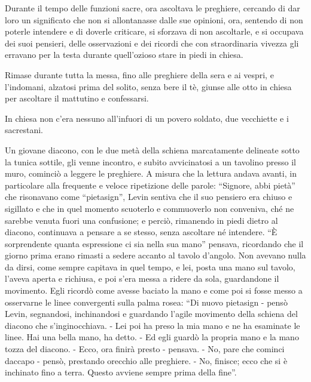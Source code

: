 Durante il tempo delle funzioni sacre, ora ascoltava le preghiere, cercando di dar loro un significato che non si allontanasse dalle sue opinioni, ora, sentendo di non poterle intendere e di doverle criticare, si sforzava di non ascoltarle, e si occupava dei suoi pensieri, delle osservazioni e dei ricordi che con straordinaria vivezza gli erravano per la testa durante quell'ozioso stare in piedi in chiesa. 

Rimase durante tutta la messa, fino alle preghiere della sera e ai vespri, e l'indomani, alzatosi prima del solito, senza bere il tè, giunse alle otto in chiesa per ascoltare il mattutino e confessarsi. 

In chiesa non c'era nessuno all'infuori di un povero soldato, due vecchiette e i sacrestani. 
\enlargethispage*{1\baselineskip}

Un giovane diacono, con le due metà della schiena marcatamente delineate sotto la tunica sottile, gli venne incontro, e subito avvicinatosi a un tavolino presso il muro, cominciò a leggere le preghiere. A misura che la lettura andava avanti, in particolare alla frequente e veloce ripetizione delle parole: ``Signore, abbi pietà'' che risonavano come ``pietasign'', Levin sentiva che il suo pensiero era chiuso e sigillato e che in quel momento scuoterlo e commuoverlo non conveniva, ché ne sarebbe venuta fuori una confusione; e perciò, rimanendo in piedi dietro al diacono, continuava a pensare a se stesso, senza ascoltare né intendere. ``È sorprendente quanta espressione ci sia nella sua mano'' pensava, ricordando che il giorno prima erano rimasti a sedere accanto al tavolo d'angolo. Non avevano nulla da dirsi, come sempre capitava in quel tempo, e lei, posta una mano sul tavolo, l'aveva aperta e richiusa, e poi s'era messa a ridere da sola, guardandone il movimento. Egli ricordò come avesse baciato la mano e come poi si fosse messo a osservarne le linee convergenti sulla palma rosea: ``Di nuovo pietasign - pensò Levin, segnandosi, inchinandosi e guardando l'agile movimento della schiena del diacono che s'inginocchiava. - Lei poi ha preso la mia mano e ne ha esaminate le linee. Hai una bella mano, ha detto. - Ed egli guardò la propria mano e la mano tozza del diacono. - Ecco, ora finirà presto - pensava. - No, pare che cominci daccapo - pensò, prestando orecchio alle preghiere. - No, finisce; ecco che si è inchinato fino a terra. Questo avviene sempre prima della fine''. 

